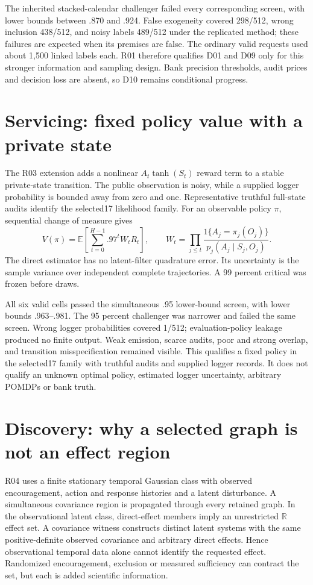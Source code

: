 \documentclass[11pt,a4paper]{article}
\newcommand{\R}{\mathbb R}
\begin{document}
The inherited stacked-calendar challenger failed every corresponding screen,
with lower bounds between .870 and .924. False exogeneity covered 298/512,
wrong inclusion 438/512, and noisy labels 489/512 under the replicated method;
these failures are expected when its premises are false. The ordinary valid
requests used about 1,500 linked labels each. R01 therefore qualifies D01 and
D09 only for this stronger information and sampling design. Bank precision
thresholds, audit prices and decision loss are absent, so D10 remains
conditional progress.

\section{Servicing: fixed policy value with a private state}

The R03 extension adds a nonlinear $A_t\tanh(S_t)$ reward term to a stable
private-state transition. The public observation is noisy, while a supplied
logger probability is bounded away from zero and one. Representative truthful
full-state audits identify the selected17 likelihood family. For an observable
policy $\pi$, sequential change of measure gives
\[
 V(\pi)=\mathbb E\left[\sum_{t=0}^{H-1} .97^t W_t R_t\right],\qquad
 W_t=\prod_{j\le t}\frac{1\{A_j=\pi_j(O_j)\}}{p_j(A_j\mid S_j,O_j)}.
\]
The direct estimator has no latent-filter quadrature error. Its uncertainty is
the sample variance over independent complete trajectories. A 99 percent
critical was frozen before draws.

All six valid cells passed the simultaneous .95 lower-bound screen, with
lower bounds .963--.981. The 95 percent challenger was narrower and failed
the same screen. Wrong logger probabilities covered 1/512; evaluation-policy
leakage produced no finite output. Weak emission, scarce audits, poor and
strong overlap, and transition misspecification remained visible. This
qualifies a fixed policy in the selected17 family with truthful audits and
supplied logger records. It does not qualify an unknown optimal policy,
estimated logger uncertainty, arbitrary POMDPs or bank truth.

\section{Discovery: why a selected graph is not an effect region}

R04 uses a finite stationary temporal Gaussian class with observed
encouragement, action and response histories and a latent disturbance. A
simultaneous covariance region is propagated through every retained graph.
In the observational latent class, direct-effect members imply an
unrestricted $\R$ effect set. A covariance witness constructs distinct latent
systems with the same positive-definite observed covariance and arbitrary
direct effects. Hence observational temporal data alone cannot identify the
requested effect. Randomized encouragement, exclusion or measured
sufficiency can contract the set, but each is added scientific information.
\end{document}

